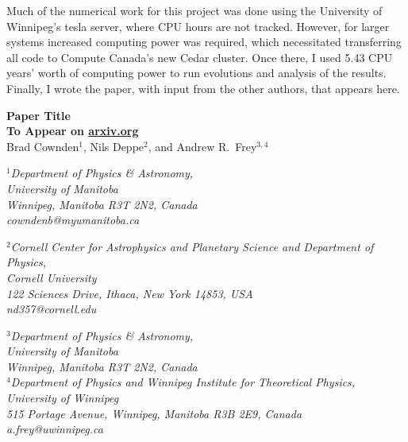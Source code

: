 \documentclass[../PhD.tex]{subfiles}
\begin{document}
Much of the numerical work for this project was done using the University of Winnipeg's tesla server, where CPU hours are not tracked. However, for larger systems increased computing power was required, which necessitated transferring all code to Compute Canada's new Cedar cluster. Once there, I used 5.43 CPU years' worth of computing power to run evolutions and analysis of the results. Finally, I wrote the paper, with input from the other authors, that appears here.

\newpage


\begin{center}
{\bf{\Large Paper Title}} \\
\bigskip
{\bf To Appear on \href{https://arxiv.org}{arxiv.org}} \\
\bigskip
\bigskip
Brad Cownden$^1$, Nils Deppe$^2$, and Andrew R.~Frey$^{3,4}$\\
\bigskip

$^1${\it Department of Physics \& Astronomy,\\ University of Manitoba\\
Winnipeg, Manitoba R3T 2N2, Canada \\ {\rm cowndenb@myumanitoba.ca}} \\
\vspace{0.1in}

$^2${\it Cornell Center for Astrophysics and Planetary Science and
Department of Physics,\\ Cornell University\\
122 Sciences Drive, Ithaca, New York 14853, USA \\ {\rm nd357@cornell.edu}} \\
\vspace{0.1in}

$^3${\it Department of Physics \& Astronomy,\\ University of Manitoba\\
Winnipeg, Manitoba R3T 2N2, Canada} \\
$^4${\it Department of Physics and Winnipeg Institute for Theoretical
Physics,\\ University of Winnipeg\\
515 Portage Avenue, Winnipeg, Manitoba R3B 2E9, Canada \\ {\rm a.frey@uwinnipeg.ca}}
\end{center}

\bigskip
\end{document}
